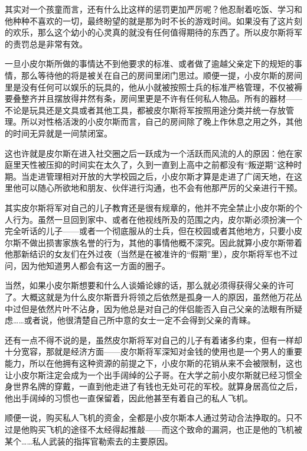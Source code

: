 其实对一个孩童而言，还有什么比这样的惩罚更加严厉呢？他忍耐着吃饭、学习和他种种不喜欢的一切，最终盼望的就是那为时不长的游戏时间。如果没有了这片刻的欢乐，那么这个幼小的心灵真的就没有任何值得期待的东西了。所以皮尔斯将军的责罚总是非常有效。

一旦小皮尔斯所做的事情达不到他要求的标准、或者做了逾越父亲定下的规矩的事情，那么等待他的将是被关在自己的房间里闭门思过。顺便一提，小皮尔斯的房间里是没有任何可以娱乐的玩具的，他从小就被按照士兵的标准严格管理，不仅被褥要叠整齐并且摆放得井然有条，房间里更是不许有任何私人物品。所有的器材——不论是玩具还是文具或者其他工具，都被皮尔斯将军按照用途分类并统一存放管理。所以对性格活泼的小皮尔斯而言，自己的房间除了晚上作休息之用之外，其他的时间无异就是一间禁闭室。

这也许就是皮尔斯在进入社交圈之后一跃成为一个活跃而风流的人的原因：他在家庭里天性被压抑的时间实在太久了，久到一直到上高中之前都没有“叛逆期”这种时期。当走进管理相对开放的大学校园之后，小皮尔斯才算是走进了广阔天地，在这里他可以随心所欲地和朋友、伙伴进行沟通，也不会有他那严厉的父亲进行干预。

其实皮尔斯将军对自己的儿子教育还是很有规章的，他并不完全禁止小皮尔斯的个人行为。虽然一旦回到家中、或者在他视线所及的范围之内，皮尔斯必须扮演一个完全听话的儿子——或者一个彻底服从的士兵，但在校园或者其他地方，只要小皮尔斯不做出损害家族名誉的行为，其他的事情他概不深究。因此就算小皮尔斯带着他那新结识的女友们在外过夜（当然是在被准许的“假期”里），皮尔斯将军也不过问，因为他知道男人都会有这一方面的圈子。

当然，如果小皮尔斯想要和什么人谈婚论嫁的话，那么就必须得获得父亲的许可了。大概这就是为什么皮尔斯晋升将领之后依然是孤身一人的原因，虽然他万花丛中过但是依然片叶不沾身，因为他总是对自己的伴侣能否入自己父亲的法眼有所疑虑……或者说，他很清楚自己所中意的女士一定不会得到父亲的青睐。

还有一点不得不说的是，虽然皮尔斯将军对自己的儿子有着诸多约束，但有一样却十分宽容，那就是经济方面——皮尔斯将军深知对金钱的使用也是一个男人的重要能力，所以在他拥有这种资源的前提之下，小皮尔斯的花销从来不会被限制，这也让小皮尔斯注定会成为一个出手阔绰的公子哥。在大学之前小皮尔斯就已经习惯全身世界名牌的穿戴，一直到他走进了有钱也无处可花的军校。就算身居高位之后，他出手阔绰的习惯也一直保留着，因此他甚至有着自己的私人飞机。

顺便一说，购买私人飞机的资金，全都是小皮尔斯本人通过劳动合法挣取的。只不过是他购买飞机的途径不太经得起推敲——而这个致命的漏洞，也正是他的飞机被某个……私人武装的指挥官勒索去的主要原因。

\section*{}


